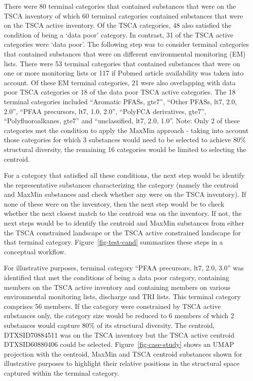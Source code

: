 \documentclass[
  super,
  preprint,
  3p]{elsarticle}
\begin{document}
There were 80 terminal categories that contained substances that were on
the TSCA inventory of which 60 terminal categories contained substances
that were on the TSCA active inventory. Of the TSCA categories, 48 also
satisfied the condition of being a `data poor' category. In contrast, 31
of the TSCA active categories were `data poor'. The following step was
to consider terminal categories that contained substances that were on
different environmental monitoring (EM) lists. There were 53 terminal
categories that contained substances that were on one or more monitoring
lists or 117 if Pubmed article availability was taken into account. Of
these EM terminal categories, 21 were also overlapping with data poor
TSCA categories or 18 of the data poor TSCA active categories. The 18
terminal categories included ``Aromatic PFASs, gte7'', ``Other PFASs,
lt7, 2.0, 2.0'', ``PFAA precursors, lt7, 1.0, 2.0'', ``PolyFCA
derivatives, gte7'', ``Polyfluoroalkanes, gte7'' and ``unclassified,
lt7, 2.0, 1.0''. Note: Only 2 of these categories met the condition to
apply the MaxMin approach - taking into account those categories for
which 3 substances would need to be selected to achieve 80\% structural
diversity, the remaining 16 categories would be limited to selecting the
centroid.

For a category that satisfied all these conditions, the next step would
be identify the representative substances characterizing the category
(namely the centroid and MaxMin substances and check whether any were on
the TSCA inventory). If none of these were on the inventory, then the
next step would be to check whether the next closest match to the
centroid was on the inventory. If not, the next steps would be to
identify the centroid and MaxMin substances from either the TSCA
constrained landscape or the TSCA active constrained landscape for that
terminal category. Figure~\ref{fig-test-cand} summarizes these steps in
a conceptual workflow.

For illustrative purposes, terminal category ``PFAA precursors, lt7,
2.0, 3.0'' was identified that met the conditions of being a data poor
category, containing members on the TSCA active inventory and containing
members on various environmental monitoring lists, discharge and TRI
lists. This terminal category comprises 56 members. If the category were
constrained by TSCA active substances only, the category size would be
reduced to 6 members of which 2 substances would capture 80\% of its
structural diversity. The centroid, DTXSID70884511 was on the TSCA
inventory but the TSCA active centroid DTXSID60880406 could be selected.
Figure~\ref{fig-case-study} shows an UMAP projection
\citep{mcinnes2020umap} with the centroid, MaxMin and TSCA centroid
substances shown for illustrative purposes to highlight their relative
positions in the structural space captured within the terminal category.
\end{document}

